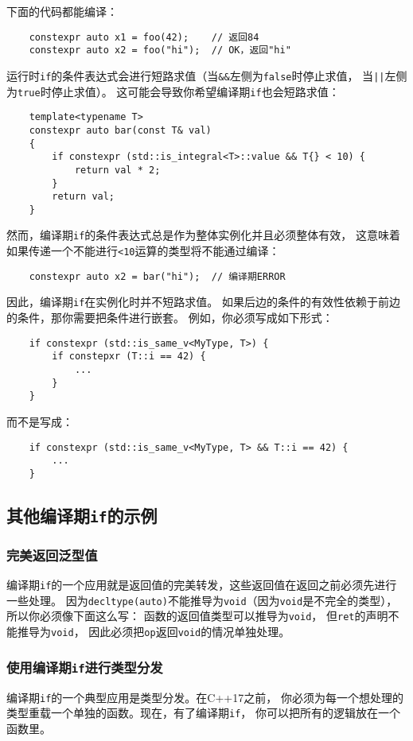 下面的代码都能编译：
\begin{lstlisting}
    constexpr auto x1 = foo(42);    // 返回84
    constexpr auto x2 = foo("hi");  // OK，返回"hi"
\end{lstlisting}
运行时\texttt{if}的条件表达式会进行短路求值（当\texttt{\&\&}左侧为\texttt{false}时停止求值，
当\texttt{||}左侧为\texttt{true}时停止求值）。
这可能会导致你希望编译期\texttt{if}也会短路求值：
\begin{lstlisting}
    template<typename T>
    constexpr auto bar(const T& val)
    {
        if constexpr (std::is_integral<T>::value && T{} < 10) {
            return val * 2;
        }
        return val;
    }
\end{lstlisting}
然而，编译期\texttt{if}的条件表达式总是作为整体实例化并且必须整体有效，
这意味着如果传递一个不能进行\texttt{<10}运算的类型将不能通过编译：
\begin{lstlisting}
    constexpr auto x2 = bar("hi");  // 编译期ERROR
\end{lstlisting}
因此，编译期\texttt{if}在实例化时并不短路求值。
如果后边的条件的有效性依赖于前边的条件，那你需要把条件进行嵌套。
例如，你必须写成如下形式：
\begin{lstlisting}
    if constexpr (std::is_same_v<MyType, T>) {
        if constepxr (T::i == 42) {
            ...
        }
    }
\end{lstlisting}
而不是写成：
\begin{lstlisting}
    if constexpr (std::is_same_v<MyType, T> && T::i == 42) {
        ...
    }
\end{lstlisting}

\subsection{其他编译期\texttt{if}的示例}
\subsubsection{完美返回泛型值}
编译期\texttt{if}的一个应用就是返回值的完美转发，这些返回值在返回之前必须先进行一些处理。
因为\texttt{decltype(auto)}不能推导为\texttt{void}（因为\texttt{void}是不完全的类型），
所以你必须像下面这么写：
函数的返回值类型可以推导为\texttt{void}，
但\texttt{ret}的声明不能推导为\texttt{void}，
因此必须把\texttt{op}返回\texttt{void}的情况单独处理。

\subsubsection{使用编译期\texttt{if}进行类型分发}
编译期\texttt{if}的一个典型应用是类型分发。在C++17之前，
你必须为每一个想处理的类型重载一个单独的函数。现在，有了编译期\texttt{if}，
你可以把所有的逻辑放在一个函数里。

